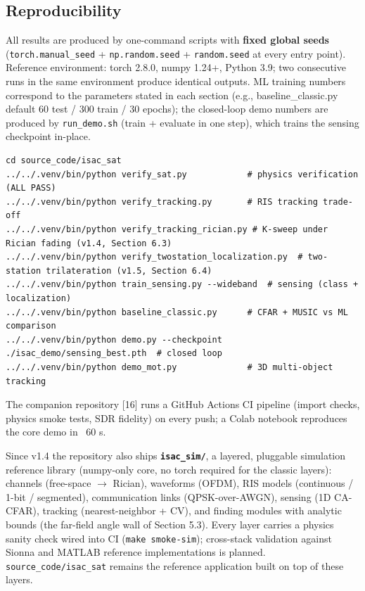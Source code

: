 \documentclass[11pt]{article}
\begin{document}
\subsection{Reproducibility}

All results are produced by one-command scripts with \textbf{fixed global seeds} (\texttt{torch.manual\_seed} + \texttt{np.random.seed} + \texttt{random.seed} at every entry point). Reference environment: torch 2.8.0, numpy 1.24+, Python 3.9; two consecutive runs in the same environment produce identical outputs. ML training numbers correspond to the parameters stated in each section (e.g., baseline\_classic.py default 60 test / 300 train / 30 epochs); the closed-loop demo numbers are produced by \texttt{run\_demo.sh} (train + evaluate in one step), which trains the sensing checkpoint in-place.

\begin{lstlisting}
cd source_code/isac_sat
../../.venv/bin/python verify_sat.py            # physics verification (ALL PASS)
../../.venv/bin/python verify_tracking.py       # RIS tracking trade-off
../../.venv/bin/python verify_tracking_rician.py # K-sweep under Rician fading (v1.4, Section 6.3)
../../.venv/bin/python verify_twostation_localization.py  # two-station trilateration (v1.5, Section 6.4)
../../.venv/bin/python train_sensing.py --wideband  # sensing (class + localization)
../../.venv/bin/python baseline_classic.py      # CFAR + MUSIC vs ML comparison
../../.venv/bin/python demo.py --checkpoint ./isac_demo/sensing_best.pth  # closed loop
../../.venv/bin/python demo_mot.py              # 3D multi-object tracking
\end{lstlisting}

The companion repository [16] runs a GitHub Actions CI pipeline (import checks, physics smoke tests, SDR fidelity) on every push; a Colab notebook reproduces the core demo in ~60 s.

Since v1.4 the repository also ships \textbf{\texttt{isac\_sim/}}, a layered, pluggable simulation reference library (numpy-only core, no torch required for the classic layers): channels (free-space $\rightarrow$ Rician), waveforms (OFDM), RIS models (continuous / 1-bit / segmented), communication links (QPSK-over-AWGN), sensing (1D CA-CFAR), tracking (nearest-neighbor + CV), and finding modules with analytic bounds (the far-field angle wall of Section 5.3). Every layer carries a physics sanity check wired into CI (\texttt{make smoke-sim}); cross-stack validation against Sionna and MATLAB reference implementations is planned. \texttt{source\_code/isac\_sat} remains the reference application built on top of these layers.
\end{document}
